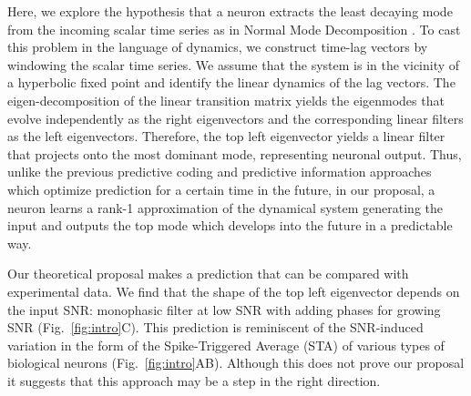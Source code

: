 \documentclass[%
 reprint,
 amsmath,amssymb,
 aps,
]{revtex4-2}
\begin{document}
Here, we explore the hypothesis that a neuron extracts the least decaying mode from the incoming scalar time series as in Normal Mode Decomposition \citep{Landau1976Mechanics}. To cast this problem in the language of dynamics, we construct time-lag vectors by windowing the scalar time series. We assume that the system is in the vicinity of a hyperbolic fixed point and identify the linear dynamics of the lag vectors. The eigen-decomposition of the linear transition matrix yields the eigenmodes that evolve independently as the right eigenvectors and the corresponding linear filters as the left eigenvectors. Therefore, the top left eigenvector yields a linear filter that projects onto the most dominant mode, representing neuronal output. Thus, unlike the previous predictive coding and predictive information approaches which optimize prediction for a certain time in the future, in our proposal, a neuron learns a rank-1 approximation of the dynamical system generating the input and outputs the top mode which develops into the future in a predictable way.

Our theoretical proposal makes a prediction that can be compared with experimental data. We find that the shape of the top left eigenvector depends on the input SNR: monophasic filter at low SNR with adding phases for growing SNR (Fig.~\ref{fig:intro}C). This prediction is reminiscent of the SNR-induced variation in the form of the Spike-Triggered Average (STA) of various types of biological neurons (Fig.~\ref{fig:intro}AB)\cite{srinivasan1982predictive,baccus2002fast,liu2015spike,chander2001adaptation,kim2001temporal,mainen1995reliability}. Although this does not prove our proposal it suggests that this approach may be a step in the right direction.
\end{document}
